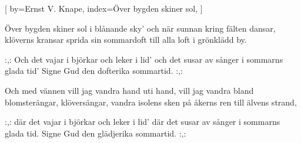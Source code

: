 

[
by={Ernst V. Knape},
index={Över bygden skiner sol},
]

\beginverse*
Över bygden skiner sol i blånande sky'
och när sunnan kring fälten dansar,
klöverns kransar
sprida sin sommardoft
till alla loft
i grönklädd by.
\endverse

\beginchorus
:,: Och det vajar i björkar och leker i lid'
och det susar av sånger i sommarns glada tid'
Signe Gud den dofterika sommartid. :,:
\endchorus							%

\beginverse* 
Och med vännen vill jag vandra hand uti hand,
vill jag vandra bland blomsterängar,
klöversängar,
vandra isolens sken
på åkerns ren
till älvens strand,
\endverse

\beginchorus
:,: där det vajar i björkar och leker i lid'
där det susar av sånger i sommarns glada tid.
Signe Gud den glädjerika sommartid. :,:
\endchorus	
\endsong


